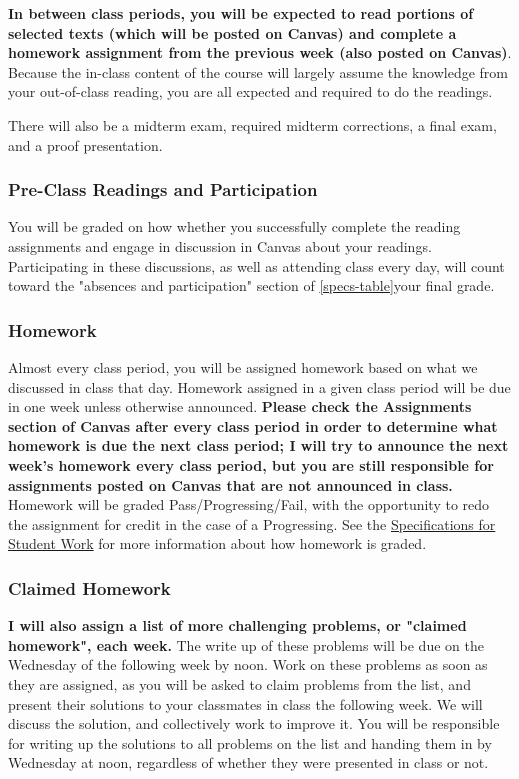\documentclass[11pt, a4paper]{article}
\begin{document}
\textbf{In between class periods, you will be expected to read portions of selected texts (which will be posted on Canvas) and complete a homework assignment from the previous week (also posted on Canvas)}. Because the in-class content of the course will largely assume the knowledge from your out-of-class reading, you are all expected and required to do the readings.

There will also be a midterm exam, required midterm corrections, a final exam, and a proof presentation.

\subsubsection*{Pre-Class Readings and Participation} You will be graded on how whether you successfully complete the reading assignments and engage in discussion in Canvas about your readings. Participating in these discussions, as well as attending class every day, will count toward the "absences and participation" section of \ref{specs-table}{your final grade}.

\subsubsection*{Homework}

Almost every class period, you will be assigned homework based on what we discussed in class that day. Homework assigned in a given class period will be due in one week unless otherwise announced. \textbf{Please check the Assignments section of Canvas after every class period in order to determine what homework is due the next class period; I will try to announce the next week's homework every class period, but you are still responsible for assignments posted on Canvas that are not announced in class.} Homework will be graded Pass/Progressing/Fail, with the opportunity to redo the assignment for credit in the case of a Progressing. See the \href{https://www.dropbox.com/s/7gbt1ffy9c02er0/Specifications_for_Student_Work_in_MATH_321.pdf?dl=0}{Specifications for Student Work} for more information about how homework is graded.

\subsubsection*{Claimed Homework}

\textbf{I will also assign a list of more challenging problems, or "claimed homework", each week.} The write up of these problems will be due on the Wednesday of the following week by noon.  Work on these problems as soon as they are assigned, as you will be asked to claim problems from the list, and present their solutions to your classmates in class the following week. We will discuss the solution, and collectively work to improve it. You will be responsible for writing up the solutions to all problems on the list and handing them in by Wednesday at noon, regardless of whether they were presented in class or not.
\end{document}
